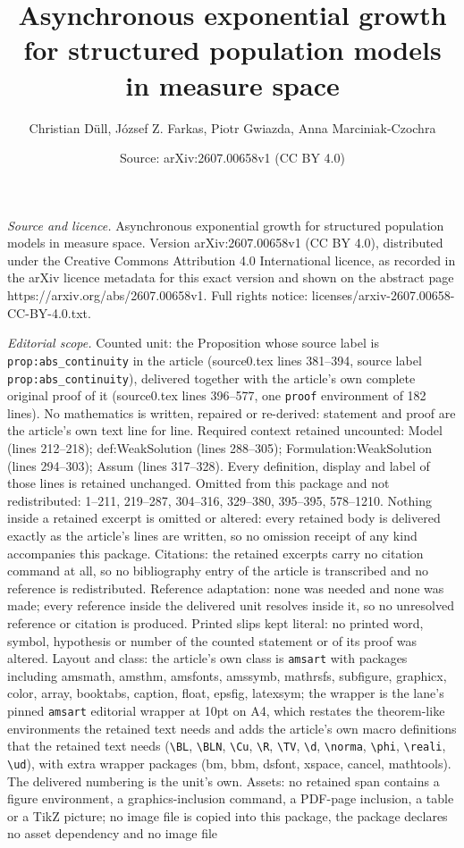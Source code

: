 \documentclass[10pt,a4paper]{amsart}
\title[Asynchronous exponential growth for structured population mo]{Asynchronous exponential growth for structured population models in measure space}
\author{Christian D\"ull, J\'ozsef Z. Farkas, Piotr Gwiazda, Anna Marciniak-Czochra}
\date{Source: arXiv:2607.00658v1 (CC BY 4.0)}
\begin{document}
\maketitle

\noindent\emph{Source and licence.} Asynchronous exponential growth for structured population models in measure space. Version arXiv:2607.00658v1 (CC BY 4.0), distributed under the Creative Commons Attribution 4.0 International licence, as recorded in the arXiv licence metadata for this exact version and shown on the abstract page https://arxiv.org/abs/2607.00658v1. Full rights notice: licenses/arxiv-2607.00658-CC-BY-4.0.txt.\par\smallskip

\noindent\textit{Editorial scope.} Counted unit: the Proposition whose source label is \texttt{prop:abs\_continuity} in the article (source0.tex lines 381--394, source label \texttt{prop:abs\_continuity}), delivered together with the article's own complete original proof of it (source0.tex lines 396--577, one \texttt{proof} environment of 182 lines). No mathematics is written, repaired or re-derived: statement and proof are the article's own text line for line. Required context retained uncounted: Model (lines 212--218); def:WeakSolution (lines 288--305); Formulation:WeakSolution (lines 294--303); Assum (lines 317--328). Every definition, display and label of those lines is retained unchanged. Omitted from this package and not redistributed: 1--211, 219--287, 304--316, 329--380, 395--395, 578--1210. Nothing inside a retained excerpt is omitted or altered: every retained body is delivered exactly as the article's lines are written, so no omission receipt of any kind accompanies this package. Citations: the retained excerpts carry no citation command at all, so no bibliography entry of the article is transcribed and no reference is redistributed. Reference adaptation: none was needed and none was made; every reference inside the delivered unit resolves inside it, so no unresolved reference or citation is produced. Printed slips kept literal: no printed word, symbol, hypothesis or number of the counted statement or of its proof was altered. Layout and class: the article's own class is \texttt{amsart} with packages including amsmath, amsthm, amsfonts, amssymb, mathrsfs, subfigure, graphicx, color, array, booktabs, caption, float, epsfig, latexsym; the wrapper is the lane's pinned \texttt{amsart} editorial wrapper at 10pt on A4, which restates the theorem-like environments the retained text needs and adds the article's own macro definitions that the retained text needs (\texttt{\textbackslash BL}, \texttt{\textbackslash BLN}, \texttt{\textbackslash Cu}, \texttt{\textbackslash R}, \texttt{\textbackslash TV}, \texttt{\textbackslash d}, \texttt{\textbackslash norma}, \texttt{\textbackslash phi}, \texttt{\textbackslash reali}, \texttt{\textbackslash ud}), with extra wrapper packages (bm, bbm, dsfont, xspace, cancel, mathtools). The delivered numbering is the unit's own. Assets: no retained span contains a figure environment, a graphics-inclusion command, a PDF-page inclusion, a table or a TikZ picture; no image file is copied into this package, the package declares no asset dependency and no image file 
\end{document}
